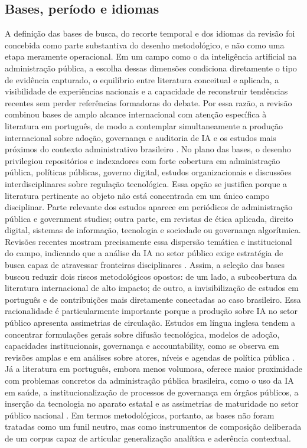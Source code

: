 \documentclass[12pt,a4paper]{article}
\begin{document}
\subsection{Bases, período e idiomas}
\label{sec:org621d95e}
A definição das bases de busca, do recorte temporal e dos idiomas da revisão foi concebida como parte substantiva do desenho metodológico, e não como uma etapa meramente operacional. Em um campo como o da inteligência artificial na administração pública, a escolha dessas dimensões condiciona diretamente o tipo de evidência capturado, o equilíbrio entre literatura conceitual e aplicada, a visibilidade de experiências nacionais e a capacidade de reconstruir tendências recentes sem perder referências formadoras do debate. Por essa razão, a revisão combinou bases de amplo alcance internacional com atenção específica à literatura em português, de modo a contemplar simultaneamente a produção internacional sobre adoção, governança e auditoria de IA e os estudos mais próximos do contexto administrativo brasileiro \autocite{madan2022ai} \autocite{serra2024a} \autocite{criado2024artificial}.
No plano das bases, o desenho privilegiou repositórios e indexadores com forte cobertura em administração pública, políticas públicas, governo digital, estudos organizacionais e discussões interdisciplinares sobre regulação tecnológica. Essa opção se justifica porque a literatura pertinente ao objeto não está concentrada em um único campo disciplinar. Parte relevante dos estudos aparece em periódicos de administração pública e government studies; outra parte, em revistas de ética aplicada, direito digital, sistemas de informação, tecnologia e sociedade ou governança algorítmica. Revisões recentes mostram precisamente essa dispersão temática e institucional do campo, indicando que a análise da IA no setor público exige estratégia de busca capaz de atravessar fronteiras disciplinares \autocite{madan2022ai} \autocite{batool2025ai}. Assim, a seleção das bases buscou reduzir dois riscos metodológicos opostos: de um lado, a subcobertura da literatura internacional de alto impacto; de outro, a invisibilização de estudos em português e de contribuições mais diretamente conectadas ao caso brasileiro.
Essa racionalidade é particularmente importante porque a produção sobre IA no setor público apresenta assimetrias de circulação. Estudos em língua inglesa tendem a concentrar formulações gerais sobre difusão tecnológica, modelos de adoção, capacidades institucionais, governança e accountability, como se observa em revisões amplas e em análises sobre atores, níveis e agendas de política pública \autocite{madan2022ai} \autocite{criado2024artificial}. Já a literatura em português, embora menos volumosa, oferece maior proximidade com problemas concretos da administração pública brasileira, como o uso da IA em saúde, a institucionalização de processos de governança em órgãos públicos, a inserção da tecnologia no aparato estatal e as assimetrias de maturidade no setor público nacional \autocite{lemes2020o} \autocite{serra2024a} \autocite{goulart2025processos} \autocite{mariano2026inteligencia}. Em termos metodológicos, portanto, as bases não foram tratadas como um funil neutro, mas como instrumentos de composição deliberada de um corpus capaz de articular generalização analítica e aderência contextual.
\end{document}
